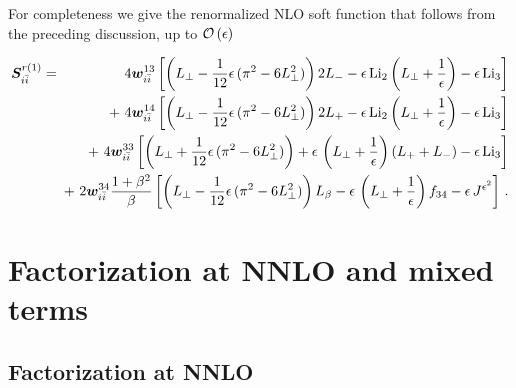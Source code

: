 \documentclass[a4paper,11pt]{report}
\numberwithin{equation}{section}
\newcommand{\Litwo}{{\text{Li}_2}}
\newcommand{\Lithree}{{\text{Li}_3}}
\newcommand{\bfS}{\bm{S}}
\newcommand{\bfw}{\bm{w}}
\newcommand{\wii}[1]{{\bfw_{i\bar i}^{#1}}}
\begin{document}
For completeness we give the renormalized NLO soft function that follows from the
preceding discussion, up to ${{\cal O}\left(\epsilon\right)}$

\begin{eqnarray}
  \bfS_{i\bar i}^{r(1)} 
  & = & \;\;\,
  4 \wii{13} \left[ 
  \left(L_\perp  - 
  \frac{1}{12} \epsilon\, (\pi^2- 6 L_\perp^2) \right) 2 L_-
  - \epsilon\, \Litwo \left(L_\perp + \frac{1}{\epsilon}\right)
  - \epsilon\, \Lithree
  \right]
  \nonumber \\
  &  & 
  \hspace{-5pt}
  +\ 4 \wii{14} \left[ 
  \left(L_\perp - 
  \frac{1}{12} \epsilon\, (\pi^2- 6 L_\perp^2) \right) 2 L_+
  - \epsilon\, \Litwo \left(L_\perp + \frac{1}{\epsilon}\right)
  - \epsilon\, \Lithree
  \right]
  \label{eq:soft-function-NLO-ren}
  \\
  &  & 
  \hspace{-5pt}
  +\ 4 \wii{33} \left[ 
  \left(L_\perp + 
  \frac{1}{12} \epsilon\, (\pi^2- 6 L_\perp^2) \right) 
  + \epsilon\, \left(L_\perp + \frac{1}{\epsilon}\right)(L_+ + L_-)
  - \epsilon\, \Lithree
  \right]
  \nonumber \\
  &  & 
  \hspace{-5pt}
  +\ 2 \wii{34} \frac{1+\beta^2}{\beta} \left[ 
  \left(L_\perp  - 
  \frac{1}{12} \epsilon\, (\pi^2- 6 L_\perp^2) \right) 
  L_\beta
  - \epsilon\, \left(L_\perp + \frac{1}{\epsilon}\right) f_{34}
  - \epsilon\, J^{\epsilon^2}
  \right]\,.
  \nonumber
\end{eqnarray}

\chapter{Factorization at NNLO and mixed terms}

\section{Factorization at NNLO}
\end{document}
